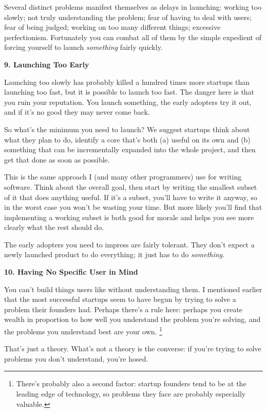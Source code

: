 Several distinct problems manifest themselves as delays in launching:
working too slowly; not truly understanding the problem; fear of having
to deal with users; fear of being judged; working on too many different
things; excessive perfectionism. Fortunately you can combat all of them
by the simple expedient of forcing yourself to launch \emph{something}
fairly quickly.

\textbf{9. Launching Too Early}

Launching too slowly has probably killed a hundred times more startups
than launching too fast, but it is possible to launch too fast. The
danger here is that you ruin your reputation. You launch something, the
early adopters try it out, and if it's no good they may never come back.

So what's the minimum you need to launch? We suggest startups think
about what they plan to do, identify a core that's both (a) useful on
its own and (b) something that can be incrementally expanded into the
whole project, and then get that done as soon as possible.

This is the same approach I (and many other programmers) use for writing
software. Think about the overall goal, then start by writing the
smallest subset of it that does anything useful. If it's a subset,
you'll have to write it anyway, so in the worst case you won't be
wasting your time. But more likely you'll find that implementing a
working subset is both good for morale and helps you see more clearly
what the rest should do.

The early adopters you need to impress are fairly tolerant. They don't
expect a newly launched product to do everything; it just has to do
\emph{something}.

\textbf{10. Having No Specific User in Mind}

You can't build things users like without understanding them. I
mentioned earlier that the most successful startups seem to have begun
by trying to solve a problem their founders had. Perhaps there's a rule
here: perhaps you create wealth in proportion to how well you understand
the problem you're solving, and the problems you understand best are
your own. \footnote{There's probably also a second factor: startup founders tend to
be at the leading edge of technology, so problems they face are probably
especially valuable.}

That's just a theory. What's not a theory is the converse: if you're
trying to solve problems you don't understand, you're hosed.


